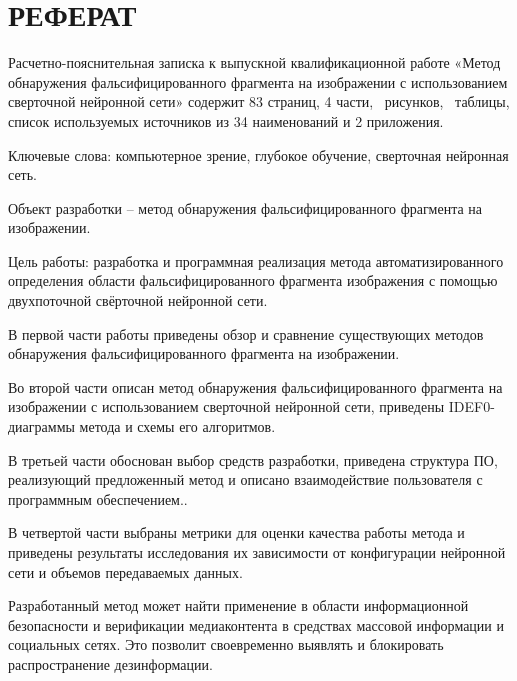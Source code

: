 \part*{РЕФЕРАТ}

Расчетно-пояснительная записка к выпускной квалификационной работе «Метод обнаружения фальсифицированного фрагмента на изображении с использованием сверточной нейронной сети» содержит 83 страниц, 4 части, \totalfigures\ рисунков,  \totaltables\ таблицы, список используемых источников из 34 наименований и 2 приложения.

Ключевые слова: компьютерное зрение, глубокое обучение, сверточная нейронная сеть.

Объект разработки – метод обнаружения фальсифицированного фрагмента на изображении.

Цель работы: разработка и программная реализация метода автоматизированного определения области фальсифицированного фрагмента изображения с помощью двухпоточной свёрточной нейронной сети.

В первой части работы приведены обзор и сравнение существующих методов обнаружения фальсифицированного фрагмента на изображении.

Во второй части описан метод обнаружения фальсифицированного фрагмента на изображении с использованием сверточной нейронной сети, приведены IDEF0-диаграммы метода и схемы его алгоритмов.

В третьей части обоснован выбор средств разработки, приведена структура ПО, реализующий предложенный метод и описано взаимодействие пользователя с программным обеспечением..

В четвертой части выбраны метрики для оценки качества работы метода и приведены результаты исследования их зависимости от конфигурации нейронной сети и объемов передаваемых данных.

Разработанный метод может найти применение в области информационной безопасности и верификации медиаконтента в средствах массовой информации и социальных сетях. Это позволит своевременно выявлять и блокировать распространение дезинформации.
